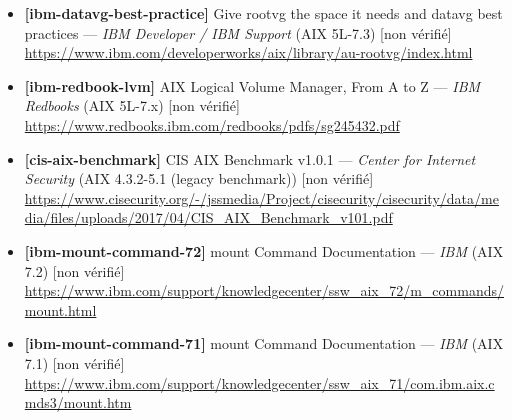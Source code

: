 \documentclass[10pt,a4paper]{article}
\begin{document}
\begin{itemize}[leftmargin=1.6em]
\item \textbf{[ibm-datavg-best-practice]} Give rootvg the space it needs and datavg best practices --- \textit{IBM Developer / IBM Support} (AIX 5L-7.3) \textcolor{cMed}{[non v\'erifi\'e]}\\ \url{https://www.ibm.com/developerworks/aix/library/au-rootvg/index.html}
\item \textbf{[ibm-redbook-lvm]} AIX Logical Volume Manager, From A to Z --- \textit{IBM Redbooks} (AIX 5L-7.x) \textcolor{cMed}{[non v\'erifi\'e]}\\ \url{https://www.redbooks.ibm.com/redbooks/pdfs/sg245432.pdf}
\item \textbf{[cis-aix-benchmark]} CIS AIX Benchmark v1.0.1 --- \textit{Center for Internet Security} (AIX 4.3.2-5.1 (legacy benchmark)) \textcolor{cMed}{[non v\'erifi\'e]}\\ \url{https://www.cisecurity.org/-/jssmedia/Project/cisecurity/cisecurity/data/media/files/uploads/2017/04/CIS_AIX_Benchmark_v101.pdf}
\item \textbf{[ibm-mount-command-72]} mount Command Documentation --- \textit{IBM} (AIX 7.2) \textcolor{cMed}{[non v\'erifi\'e]}\\ \url{https://www.ibm.com/support/knowledgecenter/ssw_aix_72/m_commands/mount.html}
\item \textbf{[ibm-mount-command-71]} mount Command Documentation --- \textit{IBM} (AIX 7.1) \textcolor{cMed}{[non v\'erifi\'e]}\\ \url{https://www.ibm.com/support/knowledgecenter/ssw_aix_71/com.ibm.aix.cmds3/mount.htm}
\end{itemize}
\end{document}
